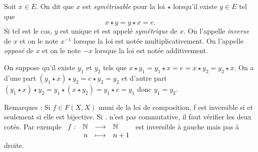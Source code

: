 \documentclass{magnolia}
\begin{document}

\begin{definition}
Soit $x\in E$. On dit que $x$ est \emph{symétrisable} pour la loi $\star$ lorsqu'il
existe $y\in E$ tel que
\[x\star y=y\star x=e.\]
Si tel est le cas, $y$ est unique et est appelé \emph{symétrique} de $x$. On l'appelle
\emph{inverse} de $x$ et on le note $x^{-1}$ lorsque la loi est notée multiplicativement.
On l'appelle \emph{opposé} de $x$ et on le note $-x$ lorsque la loi est notée
additivement.
\end{definition}

\begin{preuve}
On suppose qu'il existe $y_1$ et $y_2$ tels que $x\star y_1=y_1\star x=e=x\star y_2=y_2\star x$.
On a d'une part $(y_1\star x)\star y_2=e\star y_2=y_2$ et d'autre part $(y_1\star x)\star y_2=y_1\star (x\star y_2)=y_1\star e=y_1$ donc $y_1=y_2$.
\end{preuve}

\begin{sol}
Remarques : Si $f \in F(X,X)$ muni de la loi de composition, f est inversible si et seulement si elle est bijective. Si . n'est pas commutative, il faut vérifier les deux cotés. Par exemple $\begin{array}[t]{lrcl} \displaystyle{f} : & \displaystyle{\mathbb{N}} & \longrightarrow & \displaystyle{\mathbb{N}} \\ & \displaystyle{n} & \longmapsto & \displaystyle{n+1} \end{array}$ est inversible à gauche mais pas à droite.
\end{sol}

\end{document}

